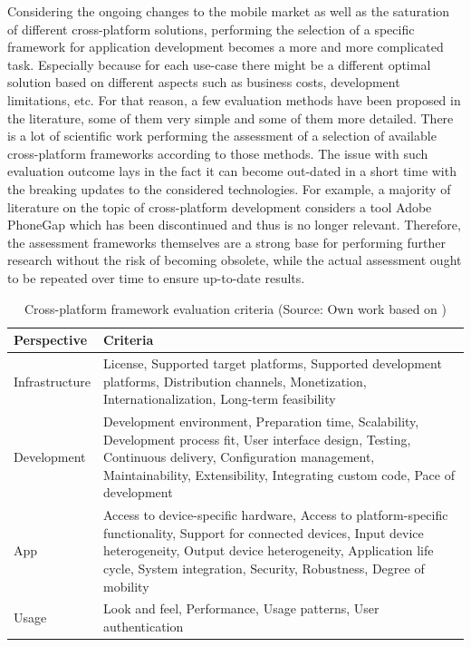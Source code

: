 Considering the ongoing changes to the mobile market as well as the saturation of different cross-platform solutions, performing the selection of a specific framework for application development becomes a more and more complicated task. Especially because for each use-case there might be a different optimal solution based on different aspects such as business costs, development limitations, etc. For that reason, a few evaluation methods have been proposed in the literature, some of them very simple and some of them more detailed. There is a lot of scientific work performing the assessment of a selection of available cross-platform frameworks according to those methods. The issue with such evaluation outcome lays in the fact it can become out-dated in a short time with the breaking updates to the considered technologies. For example, a majority of literature on the topic of cross-platform development considers a tool Adobe PhoneGap which has been discontinued and thus is no longer relevant. Therefore, the assessment frameworks themselves are a strong base for performing further research  without the risk of becoming obsolete, while the actual assessment ought to be repeated over time to ensure up-to-date results.

\begin{table}[h]
    \centering
    \caption{Cross-platform framework evaluation criteria (Source: Own work based on \cite{rieger_eval_cp})}
    \label{tab:eval_criteria}
    \begin{tabular}{ |l|p{}| }
        \hline
        \textbf{Perspective}&\textbf{Criteria}\\
        \hline
        Infrastructure&License, Supported target platforms, Supported development platforms, Distribution channels, Monetization, Internationalization, Long-term feasibility\\
        \hline
        Development&Development environment, Preparation time, Scalability, Development process fit, User interface design, Testing, Continuous delivery, Configuration management, Maintainability, Extensibility, Integrating custom code, Pace of development\\
        \hline
        App&Access to device-specific hardware, Access to platform-specific functionality, Support for connected devices, Input device heterogeneity, Output device heterogeneity, Application life cycle, System integration, Security, Robustness, Degree of mobility \\
        \hline
        Usage&Look and feel, Performance, Usage patterns, User authentication\\
        \hline
    \end{tabular}
\end{table}

